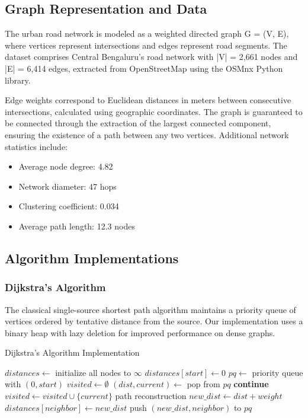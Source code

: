 \documentclass[conference]{IEEEtran}
\begin{document}
\subsection{Graph Representation and Data}

The urban road network is modeled as a weighted directed graph G = (V, E), where vertices represent intersections and edges represent road segments. The dataset comprises Central Bengaluru's road network with |V| = 2,661 nodes and |E| = 6,414 edges, extracted from OpenStreetMap using the OSMnx Python library.

Edge weights correspond to Euclidean distances in meters between consecutive intersections, calculated using geographic coordinates. The graph is guaranteed to be connected through the extraction of the largest connected component, ensuring the existence of a path between any two vertices. Additional network statistics include:

\begin{itemize}
\item Average node degree: 4.82
\item Network diameter: 47 hops
\item Clustering coefficient: 0.034
\item Average path length: 12.3 nodes
\end{itemize}

\subsection{Algorithm Implementations}

\subsubsection{Dijkstra's Algorithm}
The classical single-source shortest path algorithm maintains a priority queue of vertices ordered by tentative distance from the source. Our implementation uses a binary heap with lazy deletion for improved performance on dense graphs.

\begin{algorithm}
\caption{Dijkstra's Algorithm Implementation}
\begin{algorithmic}[1]
    \State $distances \gets$ initialize all nodes to $\infty$
    \State $distances[start] \gets 0$
    \State $pq \gets$ priority queue with $(0, start)$
    \State $visited \gets \emptyset$
        \State $(dist, current) \gets$ pop from $pq$
            \State \textbf{continue}
        \EndIf
        \State $visited \gets visited \cup \{current\}$
            \State \Return path reconstruction
        \EndIf
            \State $new\_dist \gets dist + weight$
                \State $distances[neighbor] \gets new\_dist$
                \State push $(new\_dist, neighbor)$ to $pq$
            \EndIf
        \EndForAll
    \EndWhile
\EndProcedure
\end{algorithmic}
\end{algorithm}
\end{document}
